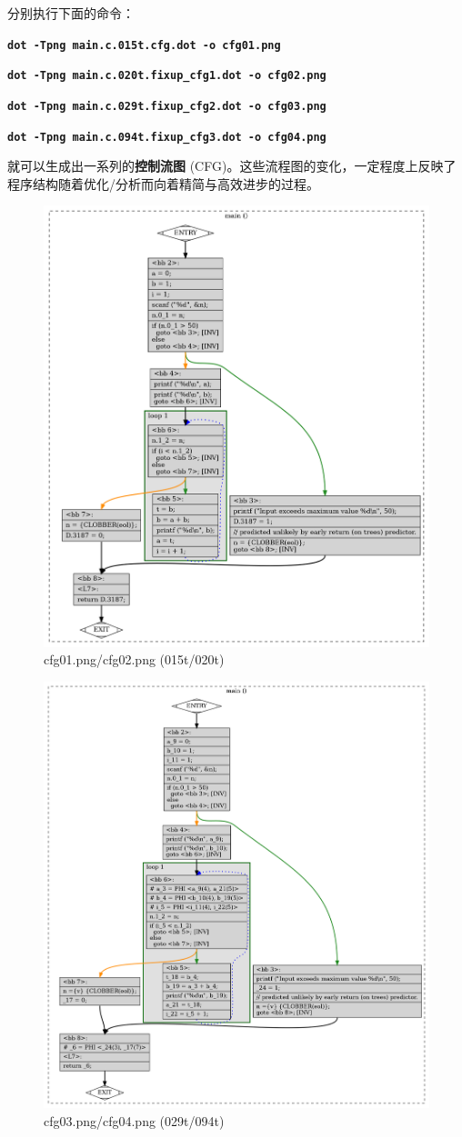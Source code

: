 \documentclass[UTF8,a4paper,10pt]{ctexart}
\begin{document}
分别执行下面的命令：

\begin{center}
    \textcolor{deepblue}{\textbf{\texttt{\large{dot -Tpng main.c.015t.cfg.dot -o cfg01.png}}}}
\end{center}

\begin{center}
    \textcolor{deepblue}{\textbf{\texttt{\large{dot -Tpng main.c.020t.fixup\_cfg1.dot -o cfg02.png}}}}
\end{center}

\begin{center}
    \textcolor{deepblue}{\textbf{\texttt{\large{dot -Tpng main.c.029t.fixup\_cfg2.dot -o cfg03.png}}}}
\end{center}

\begin{center}
    \textcolor{deepblue}{\textbf{\texttt{\large{dot -Tpng main.c.094t.fixup\_cfg3.dot -o cfg04.png}}}}
\end{center}

就可以生成出一系列的\textbf{控制流图} (CFG)。这些流程图的变化，一定程度上反映了程序结构随着优化/分析而向着精简与高效进步的过程。

\begin{figure} [H]
    \centering
    \includegraphics[width=0.5\linewidth]{ccl_5.png}
    \caption{cfg01.png/cfg02.png (015t/020t)}
    \label{fig:placeholder}
\end{figure}

\begin{figure} [H]
    \centering
    \includegraphics[width=0.5\linewidth]{ccl_7.png}
    \caption{cfg03.png/cfg04.png (029t/094t)}
    \label{fig:placeholder}
\end{figure}
\end{document}
